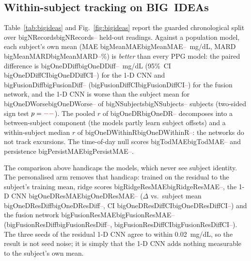 \documentclass[journal]{IEEEtran}
\newcommand{\m}[1]{\ifcsname #1\endcsname\csname #1\endcsname\else\textcolor{red}{--}\fi}
\begin{document}
\subsection{Within-subject tracking on BIG~IDEAs}
\label{sec:bigideas}
Table~\ref{tab:bigideas} and Fig.~\ref{fig:bigideas} report the guarded
chronological split over \m{bigNRecords} held-out readings.  Against a
population model, each subject's own mean (MAE \m{bigMeanMAE}~mg/dL, MARD
\m{bigMeanMARD}\%) is \emph{better} than every PPG model: the paired
difference is \m{bigOneDDiff}~mg/dL (95\%~CI \m{bigOneDDiffCI}) for the 1-D
CNN and \m{bigFusionDiff} (\m{bigFusionDiffCI}) for the fusion network, and
the 1-D CNN is worse than the subject mean for \m{bigOneDWorse} of
\m{bigNSubjects} subjects (two-sided sign test $p=\m{bigOneDSignP}$).  The
pooled $r$ of \m{bigOneDR} decomposes into a between-subject component (the
models partly learn subject offsets) and a within-subject median $r$ of
\m{bigOneDWithinR}: the networks do not track excursions.  The time-of-day
null scores \m{bigTodMAE} and persistence \m{bigPersistMAE}.

The comparison above handicaps the models, which never see subject identity.
The personalised arm removes that handicap: trained on the residual to the
subject's training mean, ridge scores \m{bigRidgeResMAE}, the 1-D CNN
\m{bigOneDResMAE} ($\Delta$ vs.\ subject mean \m{bigOneDResDiff}, CI
\m{bigOneDResDiffCI}) and the fusion network \m{bigFusionResMAE}
(\m{bigFusionResDiff}, \m{bigFusionResDiffCI}).  The three seeds of the
residual 1-D CNN agree to within 0.02~mg/dL, so the result is not seed
noise; it is simply that the 1-D CNN adds nothing measurable to the
subject's own mean.
\end{document}
